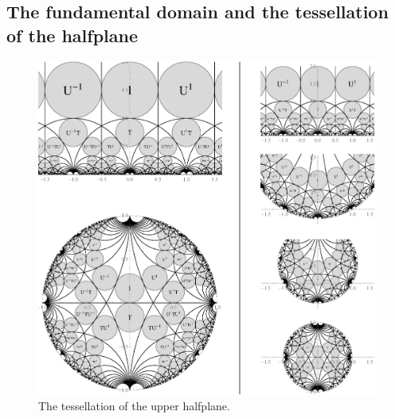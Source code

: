 \subsection{The fundamental domain and the tessellation of the halfplane}

\begin{figure}
\centering
\includegraphics[width=\textwidth]{figures/modular-tiling-1}
\caption{The tessellation of the upper halfplane.}
\label{fig_ModularTiling}
\end{figure}


